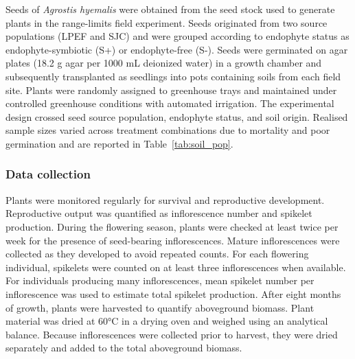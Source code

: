 \documentclass[12pt]{article}\usepackage[]{graphicx}\usepackage[dvipsnames]{xcolor}
\begin{document}
{Seeds of \textit{Agrostis hyemalis} were obtained from the seed stock used to generate plants in the range-limits field experiment. 
Seeds originated from two source populations (LPEF and SJC) and were grouped according to endophyte status as endophyte-symbiotic (S+) or endophyte-free (S-).
Seeds were germinated on agar plates (18.2 g agar per 1000 mL deionized water) in a growth chamber and subsequently transplanted as seedlings
into pots containing soils from each field site. 
Plants were randomly assigned to greenhouse trays and maintained under controlled greenhouse conditions with automated irrigation.
The experimental design crossed seed source population, endophyte status, and soil origin. 
Realised sample sizes varied across treatment combinations due to mortality and poor germination and are reported in Table~\ref{tab:soil_pop}.

\subsubsection {Data collection}

Plants were monitored regularly for survival and reproductive development. 
Reproductive output was quantified as inflorescence number and spikelet production. 
During the flowering season, plants were checked at least twice per week for the presence of seed-bearing inflorescences. 
Mature inflorescences were collected as they developed to avoid repeated counts. 
For each flowering individual, spikelets were counted on at least three inflorescences when available.
For individuals producing many inflorescences, mean spikelet number per inflorescence was used to estimate total spikelet production.
After eight months of growth, plants were harvested to quantify aboveground biomass. 
Plant material was dried at 60°C in a drying oven and weighed using an analytical balance. 
Because inflorescences were collected prior to harvest, they were dried separately and added to the total aboveground biomass.

}
\end{document}
